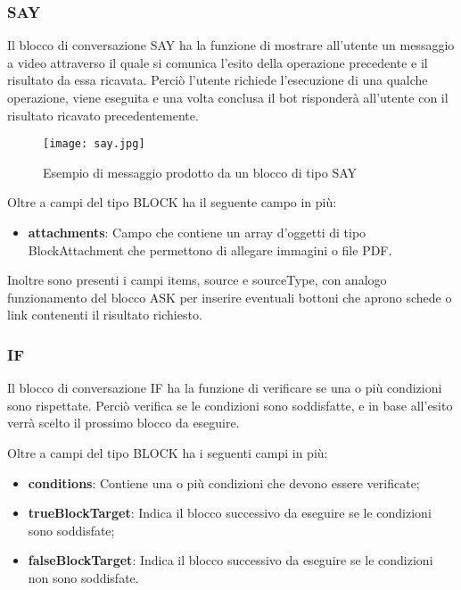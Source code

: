 \subsubsection{SAY}

Il blocco di conversazione SAY ha la funzione di mostrare all'utente un messaggio a video attraverso il quale si comunica l'esito della operazione precedente e il risultato da essa ricavata. Perciò l'utente richiede l'esecuzione di una qualche operazione, viene eseguita e una volta conclusa il \gls{bot}\ap{[g]} risponderà all'utente con il risultato ricavato precedentemente.

\begin{figure}[htbp]
	\centering
	\texttt{[image: say.jpg]}
	\caption{Esempio di messaggio prodotto da un blocco di tipo SAY}
\end{figure}
Oltre a campi del tipo BLOCK ha il seguente campo in più:

\begin{itemize}
	\item \textbf{attachments}: Campo che contiene un array d'oggetti di tipo BlockAttachment che permettono di allegare immagini o file PDF.
\end{itemize}

Inoltre sono presenti i campi items, source e sourceType, con analogo funzionamento del blocco ASK per inserire eventuali bottoni che aprono schede o link contenenti il risultato richiesto.

\subsubsection{IF}

Il blocco di conversazione IF ha la funzione di verificare se una o più condizioni sono rispettate. Perciò verifica se le condizioni sono soddisfatte, e in base all'esito verrà scelto il prossimo blocco da eseguire.

Oltre a campi del tipo BLOCK ha i seguenti campi in più:

\begin{itemize}
	\item \textbf{conditions}: Contiene una o più condizioni che devono essere verificate;
	\item \textbf{trueBlockTarget}: Indica il blocco successivo da eseguire se le condizioni sono soddisfate;
	\item \textbf{falseBlockTarget}: Indica il blocco successivo da eseguire se le condizioni non sono soddisfate.
\end{itemize}


